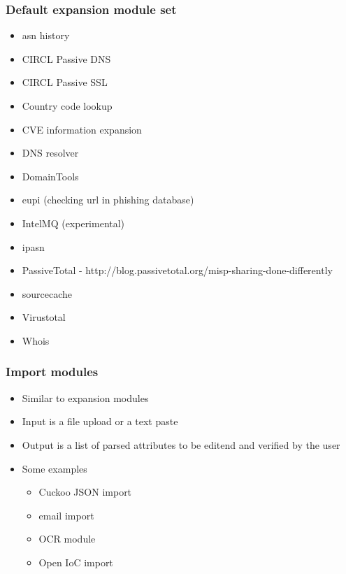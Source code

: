 \begin{frame}[fragile]
        \frametitle{Default expansion module set}
        \begin{itemize}
                \item asn history
                \item CIRCL Passive DNS
                \item CIRCL Passive SSL
                \item Country code lookup
                \item CVE information expansion
                \item DNS resolver
                \item DomainTools
                \item eupi (checking url in phishing database)
                \item IntelMQ (experimental)
                \item ipasn
                \item PassiveTotal - http://blog.passivetotal.org/misp-sharing-done-differently
                \item sourcecache
                \item Virustotal
                \item Whois
        \end{itemize}
\end{frame}

\begin{frame}[fragile]
        \frametitle{Import modules}
        \begin{itemize}
            \item Similar to expansion modules
            \item Input is a file upload or a text paste
            \item Output is a list of parsed attributes to be editend and verified by the user
            \item Some examples
            \begin{itemize}
                \item Cuckoo JSON import
                \item email import
                \item OCR module
                \item Open IoC import
            \end{itemize}
       \end{itemize}
\end{frame}

